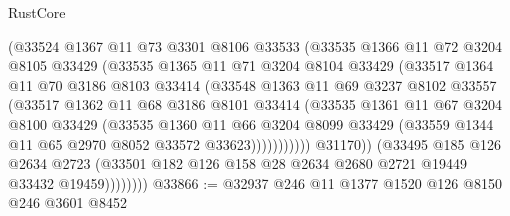 \begin{lexlean}{RustCore}
\begin{coremodule}
                        (@33524
                          @1367
                          @11
                          @73
                          @3301
                          @8106
                          @33533
                          (@33535
                            @1366
                            @11
                            @72
                            @3204
                            @8105
                            @33429
                            (@33535
                              @1365
                              @11
                              @71
                              @3204
                              @8104
                              @33429
                              (@33517
                                @1364
                                @11
                                @70
                                @3186
                                @8103
                                @33414
                                (@33548
                                  @1363
                                  @11
                                  @69
                                  @3237
                                  @8102
                                  @33557
                                  (@33517
                                    @1362
                                    @11
                                    @68
                                    @3186
                                    @8101
                                    @33414
                                    (@33535
                                      @1361
                                      @11
                                      @67
                                      @3204
                                      @8100
                                      @33429
                                      (@33535
                                        @1360
                                        @11
                                        @66
                                        @3204
                                        @8099
                                        @33429
                                        (@33559 @1344 @11 @65 @2970 @8052 @33572 @33623)))))))))))
                    @31170))
                (@33495
                  @185
                  @126
                  @2634
                  @2723
                  (@33501 @182 @126 @158 @28 @2634 @2680 @2721 @19449 @33432 @19459))))))))
@33866 := @32937
    @246
    @11
    @1377
    @1520
    @126
    @8150
    @246
    @3601
    @8452

\end{coremodule}
\end{lexlean}
